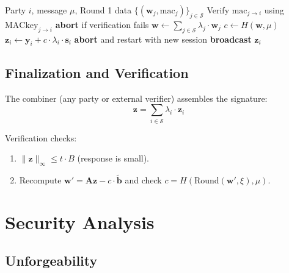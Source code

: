 \documentclass[11pt,a4paper]{article}
\begin{document}
\begin{algorithm}[H]
\caption{Ringtail Signing --- Round 2 (Message-Dependent)}
\label{alg:sign-r2}
\begin{algorithmic}[1]
\Require Party $i$, message $\mu$, Round 1 data $\{(\mathbf{w}_j, \text{mac}_j)\}_{j \in \mathcal{S}}$
\State {}
    \State Verify $\text{mac}_{j \to i}$ using $\text{MACkey}_{j \to i}$
    \State \textbf{abort} if verification fails
\EndFor
\State $\mathbf{w} \gets \sum_{j \in \mathcal{S}} \lambda_j \cdot \mathbf{w}_j$ 
\State $c \gets H(\mathbf{w}, \mu)$ 
\State $\mathbf{z}_i \gets \mathbf{y}_i + c \cdot \lambda_i \cdot \mathbf{s}_i$ 
\State {}
    \State \textbf{abort} and restart with new session
\EndIf
\State \textbf{broadcast} $\mathbf{z}_i$
\end{algorithmic}
\end{algorithm}

\subsection{Finalization and Verification}

The combiner (any party or external verifier) assembles the signature:
\[
\mathbf{z} = \sum_{i \in \mathcal{S}} \lambda_i \cdot \mathbf{z}_i
\]

Verification checks:
\begin{enumerate}[nosep]
\item $\|\mathbf{z}\|_\infty \leq t \cdot B$ (response is small).
\item Recompute $\mathbf{w}' = \mathbf{A}\mathbf{z} - c \cdot \tilde{\mathbf{b}}$ and check
$c = H(\text{Round}(\mathbf{w}', \xi), \mu)$.
\end{enumerate}

\section{Security Analysis}
\label{sec:security}

\subsection{Unforgeability}
\end{document}
